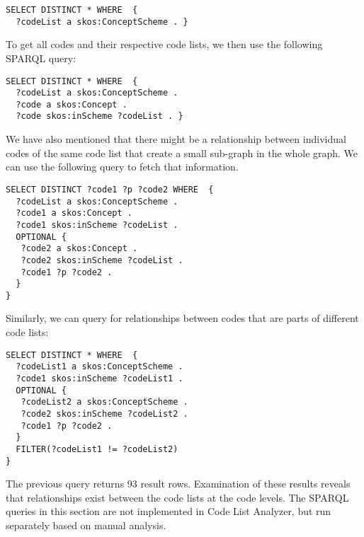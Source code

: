 \begin{lstlisting}[captionpos=b, caption=Query to get a list of code lists,label=lst:sparql7,basicstyle=\small\ttfamily,frame=single]
SELECT DISTINCT * WHERE  {
  ?codeList a skos:ConceptScheme . }
\end{lstlisting}

To get all codes and their respective code lists, we then use the following SPARQL query:

\begin{lstlisting}[captionpos=b, caption=Query to get all code lists with codes,label=lst:sparql8,basicstyle=\small\ttfamily,frame=single]
SELECT DISTINCT * WHERE  {
  ?codeList a skos:ConceptScheme .
  ?code a skos:Concept .
  ?code skos:inScheme ?codeList . }
\end{lstlisting}

We have also mentioned that there might be a relationship between individual codes of the same code list that create a small sub-graph in the whole graph. We can use the following query to fetch that information.


\begin{lstlisting}[captionpos=b, caption=Query to capture the structures of code lists,label=lst:sparql9,basicstyle=\small\ttfamily,frame=single]
SELECT DISTINCT ?code1 ?p ?code2 WHERE  {
  ?codeList a skos:ConceptScheme .
  ?code1 a skos:Concept .
  ?code1 skos:inScheme ?codeList .
  OPTIONAL {
   ?code2 a skos:Concept .
   ?code2 skos:inScheme ?codeList .
   ?code1 ?p ?code2 .
  }
}
\end{lstlisting}

Similarly, we can query for relationships between codes that are parts of different code lists:%

\begin{lstlisting}[captionpos=b, caption=Query to capture the relationships between members of different code lists,label=lst:sparql10,basicstyle=\small\ttfamily,frame=single]
SELECT DISTINCT * WHERE  {
  ?codeList1 a skos:ConceptScheme .
  ?code1 skos:inScheme ?codeList1 .
  OPTIONAL {
   ?codeList2 a skos:ConceptScheme .
   ?code2 skos:inScheme ?codeList2 .
   ?code1 ?p ?code2 .
  }
  FILTER(?codeList1 != ?codeList2)
}
\end{lstlisting}

The previous query returns 93 result rows. Examination of these results reveals that relationships exist between the code lists at the code levels. The SPARQL queries in this section are not implemented in Code List Analyzer, but run separately based on manual analysis. %